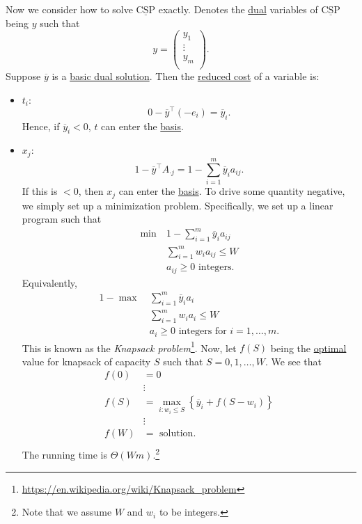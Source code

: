\begin{answer}
	Now we consider how to solve \(\mathrm{\underline{CSP}}\) exactly. Denotes the \hyperref[def:dual]{dual} variables of \(\mathrm{\underline{CSP}}\) being \(y\)
	such that
	\[
		y = \begin{pmatrix}
			y_1    \\
			\vdots \\
			y_{m}  \\
		\end{pmatrix}.
	\]
	Suppose \(\overline{y}\) is a \hyperref[def:dual-basic-solution]{basic dual solution}. Then the \hyperref[def:reduced-cost]{reduced cost} of a variable is:
	\begin{itemize}
		\item \(t_{i}\):
		      \[
			      0 - \overline{y}^{\top}(-e_{i}) = \overline{y}_{i}.
		      \]
		      Hence, if \(\overline{y}_{i}<0\), \(t\) can enter the \hyperref[def:basic]{basis}.
		\item \(x_{j}\):
		      \[
			      1 - \overline{y}^{\top}A_{\cdot j} = 1 - \sum\limits_{i=1}^{m} \overline{y}_{i}a_{ij}.
		      \]
		      If this is \(<0\), then \(x_{j}\) can enter the \hyperref[def:basic]{basis}. To drive some quantity negative, we simply set up a minimization problem.
		      Specifically, we set up a linear program such that
		      \[
			      \begin{aligned}
				      \min~ & 1 - \sum\limits_{i=1}^{m} \overline{y}_{i}a_{ij} \\
				            & \sum\limits_{i=1}^{m} w_{i}a_{ij}\leq W          \\
				            & a_{ij}\geq 0 \text{ integers}.
			      \end{aligned}
		      \]
		      Equivalently,
		      \[
			      \begin{aligned}
				      1 - \max~ & \sum\limits_{i=1}^{m} \overline{y}_{i}a_{i}         \\
				                & \sum\limits_{i=1}^{m} w_{i}a_{i}\leq W              \\
				                & a_{i}\geq 0 \text{ integers for }i = 1, \ldots , m.
			      \end{aligned}
		      \]
		      This is known as the \emph{Knapsack problem}\footnote{\url{https://en.wikipedia.org/wiki/Knapsack_problem}}. Now, let \(f(S)\) being the \hyperref[def:optimal-solution]{optimal}
		      value for knapsack of capacity \(S\) such that \(S = 0, 1, \ldots , W\). We see that
		      \[
			      \begin{split}
				      f(0) &= 0\\
				      &\vdots\\
				      f(S) &= \max_{i\colon w_{i}\leq S}\left\{ \overline{y}_{i} + f(S - w_{i})\right\}\\
				      &\vdots\\
				      f(W) &= \text{ solution}.\\
			      \end{split}
		      \]
		      The running time is \(\Theta(Wm)\).\footnote{Note that we assume \(W\) and \(w_{i}\) to be integers.}


\end{itemize}
\end{answer}
